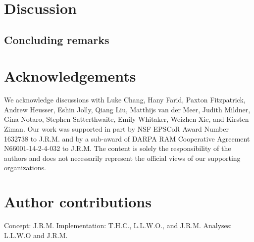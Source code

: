 \documentclass[english]{article}
\begin{document}
\section*{Discussion}



\subsection*{Concluding remarks}

\section*{Acknowledgements}
We acknowledge discussions with Luke Chang, Hany Farid, Paxton
Fitzpatrick, Andrew Heusser, Eshin Jolly, Qiang Liu, Matthijs van der
Meer, Judith Mildner, Gina Notaro, Stephen Satterthwaite, Emily
Whitaker, Weizhen Xie, and Kirsten Ziman. Our work was supported in
part by NSF EPSCoR Award Number 1632738 to J.R.M. and by a sub-award
of DARPA RAM Cooperative Agreement N66001-14-2-4-032 to J.R.M.  The
content is solely the responsibility of the authors and does not
necessarily represent the official views of our supporting
organizations.

\section*{Author contributions}
Concept: J.R.M.  Implementation: T.H.C., L.L.W.O., and
J.R.M.  Analyses: L.L.W.O and J.R.M.



\end{document}
